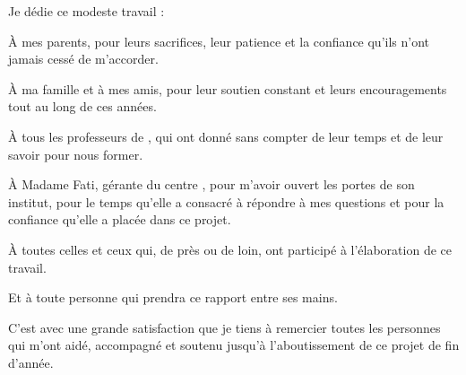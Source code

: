 

\vspace{1.5cm}
\begin{center}
\begin{minipage}{0.82\textwidth}
\itshape
\large

Je dédie ce modeste travail :

\vspace{0.7cm}

À mes parents, pour leurs sacrifices, leur patience et la confiance qu'ils
n'ont jamais cessé de m'accorder.

\vspace{0.5cm}

À ma famille et à mes amis, pour leur soutien constant et leurs
encouragements tout au long de ces années.

\vspace{0.5cm}

À tous les professeurs de \nouvelleEtablissement, qui ont donné sans compter
de leur temps et de leur savoir pour nous former.

\vspace{0.5cm}

À Madame Fati, gérante du centre \yani, pour m'avoir ouvert les portes de son
institut, pour le temps qu'elle a consacré à répondre à mes questions et pour
la confiance qu'elle a placée dans ce projet.

\vspace{0.5cm}

À toutes celles et ceux qui, de près ou de loin, ont participé à
l'élaboration de ce travail.

\vspace{0.5cm}

Et à toute personne qui prendra ce rapport entre ses mains.

\end{minipage}
\end{center}


C'est avec une grande satisfaction que je tiens à remercier toutes les
personnes qui m'ont aidé, accompagné et soutenu jusqu'à l'aboutissement de ce
projet de fin d'année.

